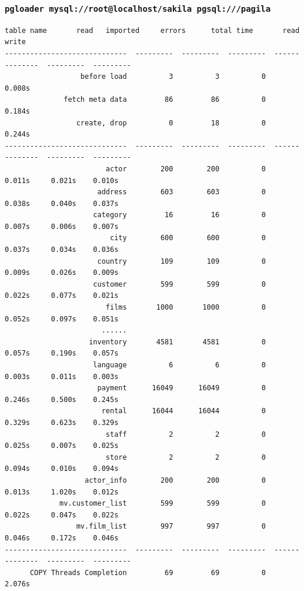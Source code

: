 \documentclass{beamer}
\begin{document}
\begin{frame}[fragile]
  \frametitle{\small{\texttt{pgloader mysql://root@localhost/sakila pgsql:///pagila}}}

\begin{Verbatim}[fontsize=\tiny]
                   table name       read   imported     errors      total time       read      write
-----------------------------  ---------  ---------  ---------  --------------  ---------  ---------
                  before load          3          3          0          0.008s                     
              fetch meta data         86         86          0          0.184s                     
                 create, drop          0         18          0          0.244s                     
-----------------------------  ---------  ---------  ---------  --------------  ---------  ---------
                        actor        200        200          0          0.011s     0.021s    0.010s
                      address        603        603          0          0.038s     0.040s    0.037s
                     category         16         16          0          0.007s     0.006s    0.007s
                         city        600        600          0          0.037s     0.034s    0.036s
                      country        109        109          0          0.009s     0.026s    0.009s
                     customer        599        599          0          0.022s     0.077s    0.021s
                        films       1000       1000          0          0.052s     0.097s    0.051s
                       ......
                    inventory       4581       4581          0          0.057s     0.190s    0.057s
                     language          6          6          0          0.003s     0.011s    0.003s
                      payment      16049      16049          0          0.246s     0.500s    0.245s
                       rental      16044      16044          0          0.329s     0.623s    0.329s
                        staff          2          2          0          0.025s     0.007s    0.025s
                        store          2          2          0          0.094s     0.010s    0.094s
                   actor_info        200        200          0          0.013s     1.020s    0.012s
             mv.customer_list        599        599          0          0.022s     0.047s    0.022s
                 mv.film_list        997        997          0          0.046s     0.172s    0.046s
-----------------------------  ---------  ---------  ---------  --------------  ---------  ---------
      COPY Threads Completion         69         69          0          2.076s                     

\end{Verbatim}
\end{frame}
\end{document}
